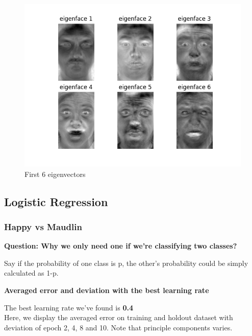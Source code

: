 \documentclass{article} %
\begin{document}
\begin{figure}[htb]
    \includegraphics[width=\textwidth]{./Images/first-6-eigenvectors.png}
    \caption{First 6 eigenvectors}
    \label{First 6 eigenvectors}
\end{figure}

\newpage
\subsection{Logistic Regression}
\subsubsection{Happy vs Maudlin}

\textbf{Question: Why we only need one if we’re classifying two classes?}

Say if the probability of one class is p, the other's probability could be simply calculated as 1-p.

\textbf{Averaged error and deviation with the best learning rate}

The best learning rate we've found is \textbf{0.4} \\
Here, we display the averaged error on training and holdout dataset with deviation of epoch 2, 4, 8 and 10. Note that principle components varies.
\end{document}
